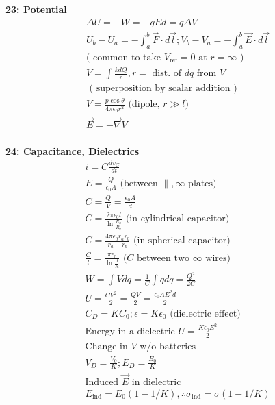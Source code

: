 \documentclass[twoside,draft]{article}
\begin{document}
\begin{multicols}{3}
  \textbf{23: Potential}
  \begin{align*}
    \Delta U = -W = -qEd = q\Delta V \\
    U_b - U_a = -\int_a^b \vec{F} \cdot d\vec{l};
    V_b - V_a = -\int_a^b \vec{E} \cdot d\vec{l} \\
    \text{( common to take $V_{\text{ref}} = 0$ at $r = \infty$ )} \\
    V = \int \frac{kdQ}{r}, r = \text{ dist. of $dq$ from $V$ } \\
    \text{ ( superposition by scalar addition ) } \\
    V = \frac{p\cos\theta}{4\pi\epsilon_0r^2} \text{ (dipole, $r \gg l$) } \\
    \vec{E} = -\vec{\nabla} V \\
  \end{align*}

  \textbf{24: Capacitance, Dielectrics}
  \begin{align*}
    i = C \frac{dv_C}{dt} \\
    E = \frac{Q}{\epsilon_{0} A} \text{ (between $\parallel, \infty$ plates) } \\
    C = \frac{Q}{V} = \frac{\epsilon_{0} A}{d} \\
    C = \frac{2\pi \epsilon_{0} l}{\ln{\frac{R_{a}}{R_{b}}}}
    \text{ (in cylindrical capacitor) } \\
    C = \frac{4\pi \epsilon_{0} r_{a} r_{b}}{r_{a} - r_{b}}
    \text{ (in spherical capacitor) } \\
    \frac{C}{l} = \frac{\pi \epsilon_{0}}{\ln{\frac{d}{R}}}
    \text{ ($C$ between two $\infty$ wires) } \\
    W = \int{V dq} = \frac{1}{C}\int{qdq} = \frac{Q^2}{2C} \\
    U = \frac{CV^2}{2} = \frac{QV}{2} = \frac{\epsilon_{0}AE^2d}{2} \\
    C_D = KC_{0}; \epsilon = K\epsilon_{0}
    \text{ (dielectric effect) } \\
    \text{Energy in a dielectric } U = \frac{K\epsilon_{0}E^2}{2} \\
    \text{Change in $V$ w/o batteries } \\
    V_D = \frac{V_{0}}{K};
    E_D = \frac{E_{0}}{K} \\
    \text{Induced $\vec{E}$ in dielectric} \\
    E_{\text{ind}} = E_{0}(1-1/K), \therefore \sigma_{\text{ind}} = \sigma(1-1/K) \\
  \end{align*}

\end{multicols}
\end{document}
